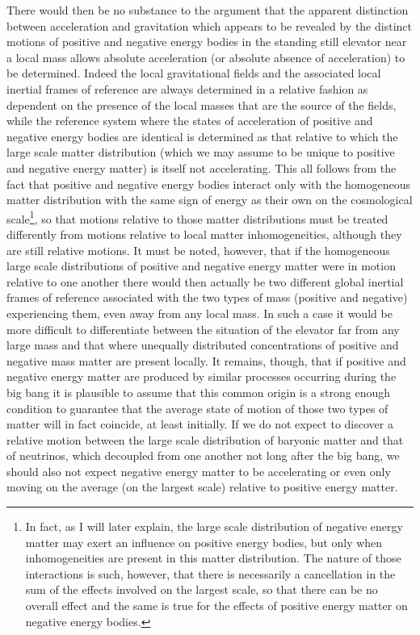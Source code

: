 \documentclass[notitlepage,12pt]{report}
\begin{document}
There would then be no substance to the argument that the apparent distinction between acceleration and gravitation which appears to be revealed by the distinct motions of positive and negative energy bodies in the standing still elevator near a local mass allows absolute acceleration (or absolute absence of acceleration) to be determined. Indeed the local gravitational fields and the associated local inertial frames of reference are always determined in a relative fashion as dependent on the presence of the local masses that are the source of the fields, while the reference system where the states of acceleration of positive and negative energy bodies are identical is determined as that relative to which the large scale matter distribution (which we may assume to be unique to positive and negative energy matter) is itself not accelerating. This all follows from the fact that positive and negative energy bodies interact only with the homogeneous matter distribution with the same sign of energy as their own on the cosmological scale\footnote{In fact, as I will later explain, the large scale distribution of negative energy matter may exert an influence on positive energy bodies, but only when inhomogeneities are present in this matter distribution. The nature of those interactions is such, however, that there is necessarily a cancellation in the sum of the effects involved on the largest scale, so that there can be no overall effect and the same is true for the effects of positive energy matter on negative energy bodies.}, so that motions relative to those matter distributions must be treated differently from motions relative to local matter inhomogeneities, although they are still relative motions. It must be noted, however, that if the homogeneous large scale distributions of positive and negative energy matter were in motion relative to one another there would then actually be two different global inertial frames of reference associated with the two types of mass (positive and negative) experiencing them, even away from any local mass. In such a case it would be more difficult to differentiate between the situation of the elevator far from any large mass and that where unequally distributed concentrations of positive and negative mass matter are present locally. It remains, though, that if positive and negative energy matter are produced by similar processes occurring during the big bang it is plausible to assume that this common origin is a strong enough condition to guarantee that the average state of motion of those two types of matter will in fact coincide, at least initially. If we do not expect to discover a relative motion between the large scale distribution of baryonic matter and that of neutrinos, which decoupled from one another not long after the big bang, we should also not expect negative energy matter to be accelerating or even only moving on the average (on the largest scale) relative to positive energy matter.
\end{document}
